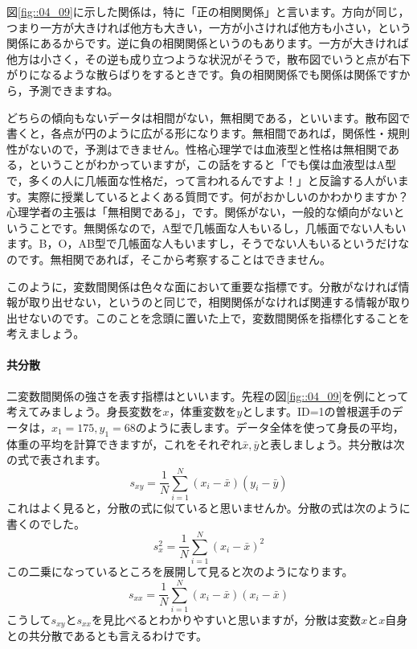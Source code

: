 \documentclass{ltjsbook}
\begin{document}
図\ref{fig::04_09}に示した関係は，特に「正の相関関係」と言います。方向が同じ，つまり一方が大きければ他方も大きい，一方が小さければ他方も小さい，という関係にあるからです。逆に負の相関関係というのもあります。一方が大きければ他方は小さく，その逆も成り立つような状況がそうで，散布図でいうと点が右下がりになるような散らばりをするときです。負の相関関係でも関係は関係ですから，予測できますね。

どちらの傾向もないデータは相間がない，無相関である，といいます。散布図で書くと，各点が円のように広がる形になります。無相間であれば，関係性・規則性がないので，予測はできません。性格心理学では血液型と性格は無相関である，ということがわかっていますが，この話をすると「でも僕は血液型はA型で，多くの人に几帳面な性格だ，って言われるんですよ！」と反論する人がいます。実際に授業しているとよくある質問です。何がおかしいのかわかりますか？ 心理学者の主張は「無相関である」，です。関係がない，一般的な傾向がないということです。無関係なので，A型で几帳面な人もいるし，几帳面でない人もいます。B，O，AB型で几帳面な人もいますし，そうでない人もいるというだけなのです。無相関であれば，そこから考察することはできません。

このように，変数間関係は色々な面において重要な指標です。分散がなければ情報が取り出せない，というのと同じで，相関関係がなければ関連する情報が取り出せないのです。このことを念頭に置いた上で，変数間関係を指標化することを考えましょう。

\paragraph{共分散}二変数間関係の強さを表す指標はといいます。先程の図\ref{fig::04_09}を例にとって考えてみましょう。身長変数を$x$，体重変数を$y$とします。ID=1の曽根選手のデータは，$x_1= 175,y_1=68$のように表します。データ全体を使って身長の平均，体重の平均を計算できますが，これをそれぞれ$\bar{x},\bar{y}$と表しましょう。共分散は次の式で表されます。
\[ s_{xy} = \frac{1}{N}\sum_{i=1}^N (x_i - \bar{x})(y_i - \bar{y})\]
これはよく見ると，分散の式に似ていると思いませんか。分散の式は次のように書くのでした。
\[ s_{x}^2 = \frac{1}{N}\sum_{i=1}^N (x_i - \bar{x})^2 \]
この二乗になっているところを展開して見ると次のようになります。
\[ s_{xx} = \frac{1}{N}\sum_{i=1}^N (x_i - \bar{x})(x_i - \bar{x}) \]
こうして$s_{xy}$と$s_{xx}$を見比べるとわかりやすいと思いますが，分散は変数$x$と$x$自身との共分散であるとも言えるわけです。
\end{document}
